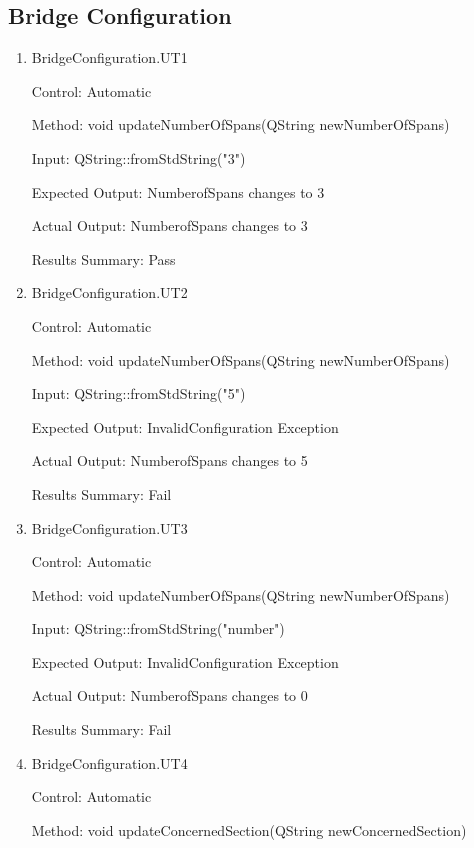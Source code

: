 \documentclass[12pt, titlepage]{article}
\begin{document}
\subsection{Bridge Configuration}
\begin{enumerate}
    \item{BridgeConfiguration.UT1\\}
    
    Control: Automatic
    
    Method:  void updateNumberOfSpans(QString newNumberOfSpans)
    
    Input: QString::fromStdString("3")
    
    Expected Output: NumberofSpans changes to 3

    Actual Output: NumberofSpans changes to 3

    Results Summary: Pass

    \item{BridgeConfiguration.UT2\\}
    
    Control: Automatic
    
    Method:  void updateNumberOfSpans(QString newNumberOfSpans)
    
    Input: QString::fromStdString("5")
    
    Expected Output: InvalidConfiguration Exception

    Actual Output: NumberofSpans changes to 5

    Results Summary: Fail

    \item {BridgeConfiguration.UT3\\}
    
    Control: Automatic
    
    Method:  void updateNumberOfSpans(QString newNumberOfSpans)
    
    Input: QString::fromStdString("number")
    
    Expected Output: InvalidConfiguration Exception

    Actual Output: NumberofSpans changes to 0

    Results Summary: Fail
    
    \item {BridgeConfiguration.UT4\\}
    
    Control: Automatic
    
    Method:  void updateConcernedSection(QString newConcernedSection)
    

\end{enumerate}
\end{document}
